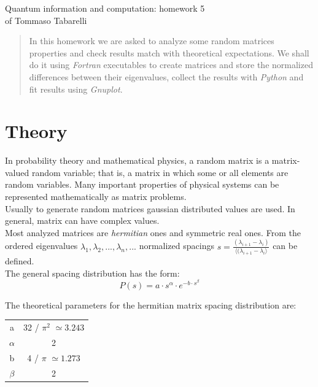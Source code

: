 \documentclass[12pt, a4paper, notitlepage]{report}
\begin{document}
\begin{center}
	\LARGE{Quantum information and computation: homework 5}\\
	\Large{of Tommaso Tabarelli}
\end{center}


\begin{abstract}
	In this homework we are asked to analyze some random matrices properties and check results match with theoretical expectations. We shall do it using \textit{Fortran} executables to create matrices and store the normalized differences between their eigenvalues, collect the results with \textit{Python} and fit results using \textit{Gnuplot}.
\end{abstract}

\section*{Theory}
In probability theory and mathematical physics, a random matrix is a matrix-valued random variable; that is, a matrix in which some or all elements are random variables. Many important properties of physical systems can be represented mathematically as matrix problems.\\
Usually to generate random matrices gaussian distributed values are used. In general, matrix can have complex values.\\
Most analyzed matrices are \textit{hermitian} ones and symmetric real ones. From the ordered eigenvalues $\lambda_1,\lambda_2,...,\lambda_n,...$ normalized spacings $s = \frac{(\lambda_{i+1} - \lambda_{i})}{\langle (\lambda_{i+1} - \lambda_{i} \rangle} $ can be defined.\\
The general spacing distribution has the form:
$$ P(s) = a \cdot s^\alpha \cdot e^{-b \cdot s^\beta} $$

The theoretical parameters for the hermitian matrix spacing distribution are:
\begin{table}[H]
	\centering
	\begin{tabular}{|c|c|}

	\hline
	
	a			& 32 / $\pi^2$ $\simeq 3.243$ 	\\
	$\alpha$	& 2				\\
	b			& 4 / $\pi$	$\simeq 1.273 $	\\
	$\beta$		& 2				\\
	
	\hline

	\end{tabular}
\end{table}
\end{document}
